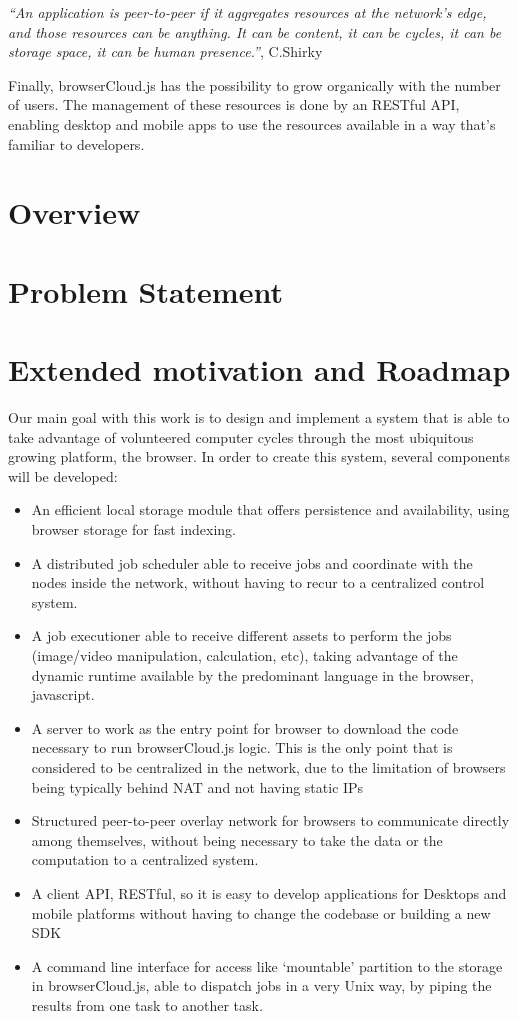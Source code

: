   \textit{``An application is peer-to-peer if it aggregates resources at the network’s edge, and those resources can be anything. It can be content, it can be cycles, it can be storage space, it can be human presence.''}, C.Shirky \cite{Shirky.}

Finally, browserCloud.js has the possibility to grow organically with the number of users. The management of these resources is done by an RESTful API, enabling desktop and mobile apps to use the resources available in a way that's familiar to developers. 

\section{Overview}


\section{Problem Statement}


\section{Extended motivation and Roadmap}

Our main goal with this work is to design and implement a system that is able to take advantage of volunteered computer cycles through the most ubiquitous growing platform, the browser. In order to create this system, several components will be developed:

\begin{itemize}
    \item An efficient local storage module that offers persistence and availability, using browser storage for fast indexing.
    \item A distributed job scheduler able to receive jobs and coordinate with the nodes inside the network, without having to recur to a centralized control system.
    \item A job executioner able to receive different assets to perform the jobs (image/video manipulation, calculation, etc), taking advantage of the dynamic runtime available by the predominant language in the browser, javascript.
    \item A server to work as the entry point for browser to download the code necessary to run browserCloud.js logic. This is the only point that is considered to be centralized in the network, due to the limitation of browsers being typically behind NAT and not having static IPs
    \item Structured peer-to-peer overlay network for browsers to communicate directly among themselves, without being necessary to take the data or the computation to a centralized system.
    \item A client API, RESTful, so it is easy to develop applications for Desktops and mobile platforms without having to change the codebase or building a new SDK
    \item A command line interface for access like `mountable' partition to the storage in browserCloud.js, able to dispatch jobs in a very Unix way, by piping the results from one task to another task.
\end{itemize}

